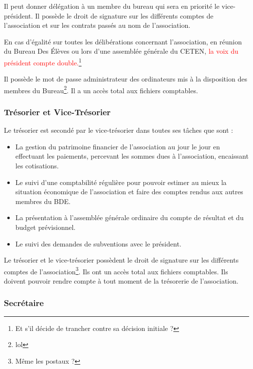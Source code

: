 \documentclass{article} %
\begin{document}
				Il peut donner délégation à un membre du bureau qui sera en
				priorité le vice-président. Il possède le droit de signature sur
				les différents comptes de l'association et sur les contrats
				passés au nom de l’association.
				
				En cas d’égalité sur toutes les délibérations concernant
				l’association, en réunion du Bureau Des Élèves ou lors d’une
				assemblée générale du CETEN, \textcolor{red}{la voix du
				président compte double.}\footnote{Et s'il décide de trancher
				contre sa décision initiale ?}

				Il possède le mot de passe administrateur des ordinateurs mis à
				la disposition des membres du Bureau\footnote{lol}. Il a un
				accès total aux fichiers comptables.

			\subsubsection{Trésorier et Vice-Trésorier}

				Le trésorier est secondé par le vice-trésorier dans toutes ses
				tâches que sont :
				\begin{itemize}
					\item La gestion du patrimoine financier de l’association au
						jour le jour en effectuant les paiements, percevant les
						sommes dues à l’association, encaissant les cotisations.
					\item Le suivi d’une comptabilité régulière pour pouvoir
						estimer au mieux la situation économique de
						l’association et faire des comptes rendus aux autres
						membres du BDE.
					\item La présentation à l’assemblée générale ordinaire du
						compte de résultat et du budget prévisionnel.
					\item Le suivi des demandes de subventions avec le
						président.
				\end{itemize}

				Le trésorier et le vice-trésorier possèdent le droit de
				signature sur les différents comptes de
				l'association\footnote{Même les postaux ?}. Ils ont un accès
				total aux fichiers comptables. Ils doivent pouvoir rendre compte
				à tout moment de la trésorerie de l’association.

			\subsubsection{Secrétaire}
\end{document}
